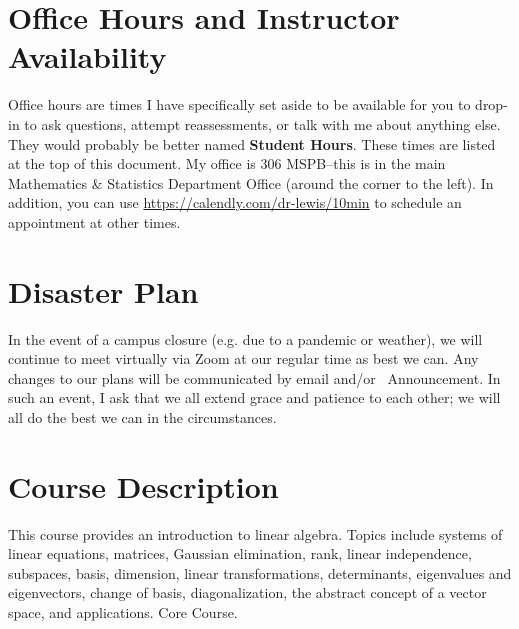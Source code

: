 \documentclass{article}
\begin{document}
\section*{\fontsize{12}{15}\selectfont Office Hours and Instructor Availability}

Office hours are times I have specifically set aside to be available for you to drop-in to ask questions, attempt reassessments, or talk with me about anything else. They would probably be better named \textbf{Student Hours}.  These times are listed at the top of this document. My office is 306 MSPB--this is in the main Mathematics \& Statistics Department Office (around the corner to the left). In addition, you can use \url{https://calendly.com/dr-lewis/10min} to schedule an appointment at other times.

\section*{\fontsize{12}{15}\selectfont Disaster Plan}
In the event of a campus closure (e.g. due to a pandemic or weather), we will continue to meet virtually via Zoom at our regular time as best we can. Any changes to our plans will be communicated by email and/or \LMS\ Announcement. In such an event, I ask that we all extend grace and patience to each other; we will all do the best we can in the circumstances.

\section*{\fontsize{12}{15}\selectfont Course Description}
This course provides an introduction to linear algebra. Topics include systems of linear equations, matrices, Gaussian elimination, rank, linear independence, subspaces, basis, dimension, linear transformations, determinants, eigenvalues and eigenvectors, change of basis, diagonalization, the abstract concept of a vector space, and applications. Core Course.
\end{document}
